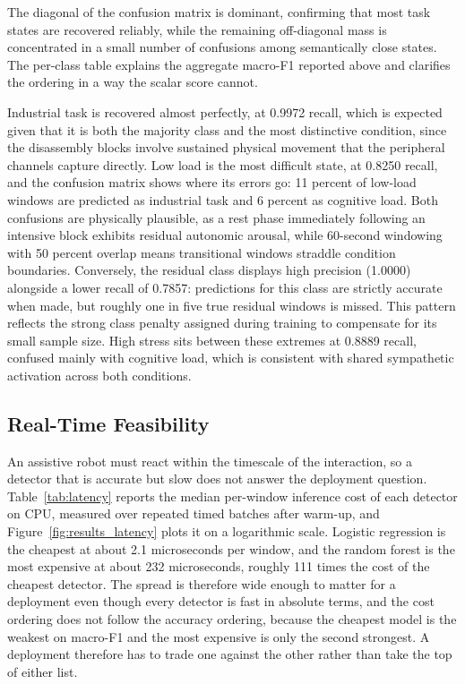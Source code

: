 \documentclass[a4paper,twoside]{article}
\begin{document}
The diagonal of the confusion matrix is dominant, confirming that most task states are recovered reliably, while the remaining off-diagonal mass is concentrated in a small number of confusions among semantically close states. The per-class table explains the aggregate macro-F1 reported above and clarifies the ordering in a way the scalar score cannot.

Industrial task is recovered almost perfectly, at 0.9972 recall, which is expected given that it is both the majority class and the most distinctive condition, since the disassembly blocks involve sustained physical movement that the peripheral channels capture directly. Low load is the most difficult state, at 0.8250 recall, and the confusion matrix shows where its errors go: 11 percent of low-load windows are predicted as industrial task and 6 percent as cognitive load. Both confusions are physically plausible, as a rest phase immediately following an intensive block exhibits residual autonomic arousal, while 60-second windowing with 50 percent overlap means transitional windows straddle condition boundaries. Conversely, the residual class displays high precision (1.0000) alongside a lower recall of 0.7857: predictions for this class are strictly accurate when made, but roughly one in five true residual windows is missed. This pattern reflects the strong class penalty assigned during training to compensate for its small sample size. High stress sits between these extremes at 0.8889 recall, confused mainly with cognitive load, which is consistent with shared sympathetic activation across both conditions.

\subsection{Real-Time Feasibility}

\noindent An assistive robot must react within the timescale of the interaction, so a detector that is accurate but slow does not answer the deployment question. Table~\ref{tab:latency} reports the median per-window inference cost of each detector on CPU, measured over repeated timed batches after warm-up, and Figure~\ref{fig:results_latency} plots it on a logarithmic scale. Logistic regression is the cheapest at about 2.1 microseconds per window, and the random forest is the most expensive at about 232 microseconds, roughly 111 times the cost of the cheapest detector. The spread is therefore wide enough to matter for a deployment even though every detector is fast in absolute terms, and the cost ordering does not follow the accuracy ordering, because the cheapest model is the weakest on macro-F1 and the most expensive is only the second strongest. A deployment therefore has to trade one against the other rather than take the top of either list.
\end{document}

